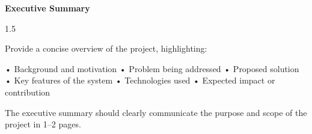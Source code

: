 

\newpage
\thispagestyle{plain}


\begin{center}
\textbf{\LARGE Executive Summary}
\end{center}

\vspace{1cm}

\begin{spacing}{1.5}

Provide a concise overview of the project, highlighting:

• Background and motivation  
• Problem being addressed  
• Proposed solution  
• Key features of the system  
• Technologies used  
• Expected impact or contribution  

The executive summary should clearly communicate the purpose and scope of the project in 1–2 pages.

\end{spacing}
\newpage
